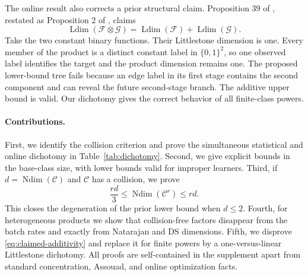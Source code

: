 \documentclass[twoside]{article}
\newcommand{\C}{\mathcal C}
\newcommand{\Ldim}{\operatorname{Ldim}}
\newcommand{\Ndim}{\operatorname{Ndim}}
\begin{document}
The online result also corrects a prior structural claim. Proposition 39 of \citet{hanneke2024list}, restated as Proposition 2 of \citet{hanneke2024open}, claims
\begin{equation}
 \Ldim(\mathcal F\otimes\mathcal G)=\Ldim(\mathcal F)+\Ldim(\mathcal G).
 \label{eq:claimed-additivity}
\end{equation}
Take the two constant binary functions. Their Littlestone dimension is one. Every member of the product is a distinct constant label in $\{0,1\}^2$, so one observed label identifies the target and the product dimension remains one. The proposed lower-bound tree fails because an edge label in its first stage contains the second component and can reveal the future second-stage branch. The additive upper bound is valid. Our dichotomy gives the correct behavior of all finite-class powers.

\paragraph{Contributions.} First, we identify the collision criterion and prove the simultaneous statistical and online dichotomy in Table~\ref{tab:dichotomy}. Second, we give explicit bounds in the base-class size, with lower bounds valid for improper learners. Third, if $d=\Ndim(\C)$ and $\C$ has a collision, we prove
\begin{equation}
 \frac{rd}{3}\leq \Ndim(\C^r)\leq rd.
 \label{eq:natarajan-factor}
\end{equation}
This closes the degeneration of the prior lower bound when $d\leq2$. Fourth, for heterogeneous products we show that collision-free factors disappear from the batch rates and exactly from Natarajan and DS dimensions. Fifth, we disprove \eqref{eq:claimed-additivity} and replace it for finite powers by a one-versus-linear Littlestone dichotomy. All proofs are self-contained in the supplement apart from standard concentration, Assouad, and online optimization facts.
\end{document}
